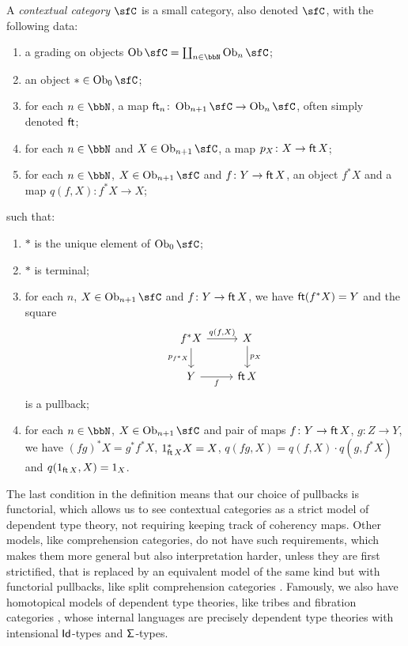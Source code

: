 \begin{defn}
  A \emph{contextual category} $\sfC$ is a small category, also denoted $\sfC$,
  with the following data:
  \begin{enumerate}
    \item a grading on objects $\Ob\sfC=\coprod_{n\in\bbN}\Ob_n\sfC$;
    \item an object $*\in\Ob_0\sfC$;
    \item for each $n\in\bbN$, a map
      $\cft_n\colon\Ob_{n+1}\sfC\rightarrow\Ob_n\sfC$, often simply denoted
      $\operatorname{\mathsf{ft}}$;
    \item for each $n\in\bbN$ and $X\in\Ob_{n+1}\sfC$, a map $p_X\colon
      X\rightarrow\operatorname{\mathsf{ft}} X$;
    \item for each $n\in\bbN$, $X\in\Ob_{n+1}\sfC$ and $f\colon Y\rightarrow
      \operatorname{\mathsf{ft}} X$, an object $f^*X$ and a map $q(f,X)\colon f^*X\rightarrow X$;
  \end{enumerate}
  such that:
  \begin{enumerate}
    \item $*$ is the unique element of $\Ob_0\sfC$;
    \item $*$ is terminal;
    \item for each $n$, $X\in\Ob_{n+1}\sfC$ and $f\colon Y\rightarrow \operatorname{\mathsf{ft}} X$, we
      have $\operatorname{\mathsf{ft}}(f^*X)=Y$ and the square
      \[\begin{tikzcd}
        {f^*X} & X \\
        Y & \cft X
        \arrow["f"', from=2-1, to=2-2]
        \arrow["{p_X}", from=1-2, to=2-2]
        \arrow["{q(f,X)}", from=1-1, to=1-2]
        \arrow["{p_{f^*X}}"', from=1-1, to=2-1]
      \end{tikzcd}\]
      is a pullback;
    \item for each $n\in\bbN$, $X\in\Ob_{n+1}\sfC$ and pair of maps $f\colon
      Y\rightarrow \operatorname{\mathsf{ft}} X$, $g\colon Z\rightarrow Y$, we have $(fg)^*X=g^*f^*X$,
      $1^*_{\operatorname{\mathsf{ft}} X}X=X$, $q(fg,X)=q(f,X)\cdot q(g,f^*X)$ and $q(1_{\operatorname{\mathsf{ft}} X},X)=1_X$.
  \end{enumerate}
\end{defn}

\begin{rmk}
  The last condition in the definition means that our choice of pullbacks is
  functorial, which allows us to see contextual categories as a strict model of
  dependent type theory, not requiring keeping track of coherency maps.
  Other models, like comprehension categories, do not
  have such requirements, which makes them more general but also
  interpretation harder, unless they are first strictified, that is replaced by
  an equivalent model of the same kind but with functorial pullbacks, like split
  comprehension
  categories . Famously, we also have
  homotopical models of dependent type
  theories, like tribes and fibration categories , whose
  internal languages are precisely dependent type theories with intensional
  $\operatorname{\mathsf{Id}}$-types and $\operatorname{\mathsf{\Sigma}}$-types.
\end{rmk}

